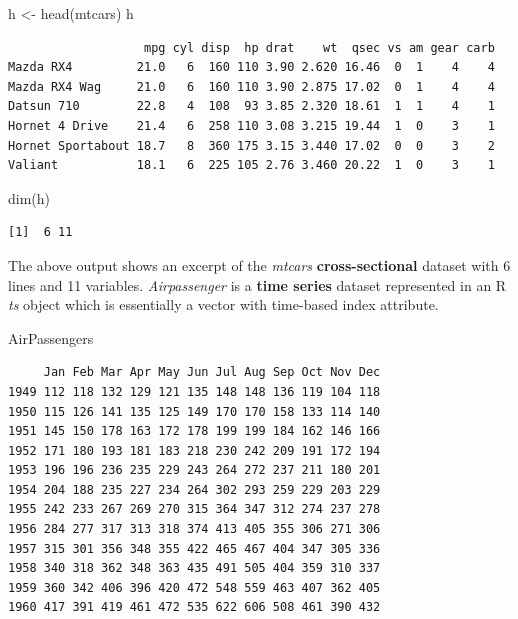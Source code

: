 \documentclass[
  12pt,
  letterpaper,
]{krantz}
\newenvironment{Shaded}{\begin{snugshade}}{\end{snugshade}}
\newcommand{\FunctionTok}[1]{\textcolor[rgb]{0.28,0.35,0.67}{#1}}
\newcommand{\NormalTok}[1]{\textcolor[rgb]{0.00,0.23,0.31}{#1}}
\newcommand{\OtherTok}[1]{\textcolor[rgb]{0.00,0.23,0.31}{#1}}
\begin{document}
\tiny

\begin{Shaded}
\begin{Highlighting}[]
\NormalTok{h }\OtherTok{\textless{}{-}} \FunctionTok{head}\NormalTok{(mtcars)}
\NormalTok{h}
\end{Highlighting}
\end{Shaded}

\begin{verbatim}
                   mpg cyl disp  hp drat    wt  qsec vs am gear carb
Mazda RX4         21.0   6  160 110 3.90 2.620 16.46  0  1    4    4
Mazda RX4 Wag     21.0   6  160 110 3.90 2.875 17.02  0  1    4    4
Datsun 710        22.8   4  108  93 3.85 2.320 18.61  1  1    4    1
Hornet 4 Drive    21.4   6  258 110 3.08 3.215 19.44  1  0    3    1
Hornet Sportabout 18.7   8  360 175 3.15 3.440 17.02  0  0    3    2
Valiant           18.1   6  225 105 2.76 3.460 20.22  1  0    3    1
\end{verbatim}

\begin{Shaded}
\begin{Highlighting}[]
\FunctionTok{dim}\NormalTok{(h)}
\end{Highlighting}
\end{Shaded}

\begin{verbatim}
[1]  6 11
\end{verbatim}

\normalsize

The above output shows an excerpt of the \emph{mtcars}
\textbf{cross-sectional} dataset with 6 lines and 11 variables.
\emph{Airpassenger} is a \textbf{time series} dataset
represented in an R \emph{ts} object which is essentially a vector with
time-based index attribute.

\normalsize

\begin{Shaded}
\begin{Highlighting}[]
\NormalTok{AirPassengers}
\end{Highlighting}
\end{Shaded}

\begin{verbatim}
     Jan Feb Mar Apr May Jun Jul Aug Sep Oct Nov Dec
1949 112 118 132 129 121 135 148 148 136 119 104 118
1950 115 126 141 135 125 149 170 170 158 133 114 140
1951 145 150 178 163 172 178 199 199 184 162 146 166
1952 171 180 193 181 183 218 230 242 209 191 172 194
1953 196 196 236 235 229 243 264 272 237 211 180 201
1954 204 188 235 227 234 264 302 293 259 229 203 229
1955 242 233 267 269 270 315 364 347 312 274 237 278
1956 284 277 317 313 318 374 413 405 355 306 271 306
1957 315 301 356 348 355 422 465 467 404 347 305 336
1958 340 318 362 348 363 435 491 505 404 359 310 337
1959 360 342 406 396 420 472 548 559 463 407 362 405
1960 417 391 419 461 472 535 622 606 508 461 390 432
\end{verbatim}
\end{document}
